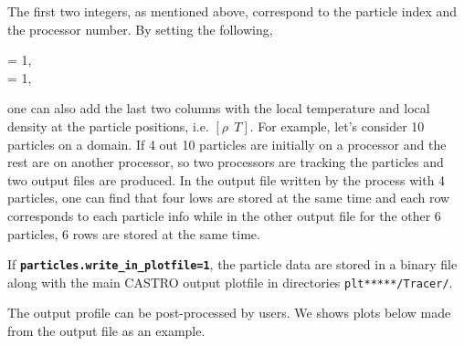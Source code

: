 \noindent The first two integers, as mentioned above, correspond to the particle index and the processor number. By setting the following,

\vspace{0.1in}
= 1,\\
     = 1,
\vspace{0.1in}

\noindent one can also add the last two columns with the local temperature and local density at the particle positions, i.e. $[\rho ~~ T]$. For example, let's consider 10 particles on a domain.  If 4 out 10 particles are initially on a processor and the rest are on another processor, so two processors are tracking the particles and two output files are produced. In the output file written by the process with 4 particles, one can find that four lows are stored at the same time and each row corresponds to each particle info while in the other output file for the other 6 particles, 6 rows are stored at the same time. 



\vspace{0.05in}

\noindent If {\tt {\bf particles.write\_in\_plotfile=1}}, the particle data are stored in a binary file along with the main CASTRO output plotfile in directories {\tt plt*****/Tracer/}. 
\vspace{0.05in}


\noindent The output profile can be post-processed by users. We shows plots below made from the output file as an example.

